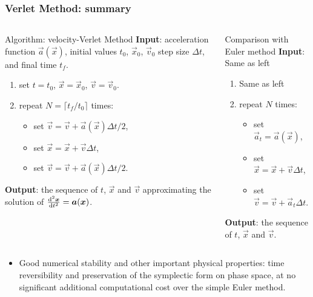 \documentclass[11pt,aspectratio=169,handout]{beamer}
\begin{document}
\begin{frame}
\frametitle{Verlet Method: summary}

\begin{columns}[c]


\begin{block}{Algorithm: velocity-Verlet Method}
	\pause
	\textbf{Input}: acceleration function $\vec{a}(\vec{x})$, initial values $t_0$, $\vec{x}_0$, $\vec{v}_0$ step size $\Delta t$, and final time $t_f$. 
	\pause
	\begin{enumerate}
		\item set $t=t_0$, $\vec{x}=\vec{x}_0$, $\vec{v}=\vec{v}_0$. 
	
		\item repeat $N = \lceil t_f/t_0\rceil$ times:
		\pause
		\begin{itemize}
			\item set $\vec{v} = \vec{v} + \vec{a}(\vec{x})\Delta t / 2$,
			\pause
			\item set $\vec{x} = \vec{x} + \vec{v}\Delta t$,
			\pause
			\item set  $\vec{v} = \vec{v} + \vec{a}(\vec{x})\Delta t / 2$.
		\end{itemize}		
	\end{enumerate}  
	\pause
	\textbf{Output}: the sequence of $t$, $\vec{x}$ and $\vec{v}$ approximating the solution of $\frac{{\rm {d}}^2 \boldsymbol{x}}{{\rm {d}} t^2} = \boldsymbol{a}(\boldsymbol{x})$.
\end{block}
\pause
\begin{alertblock}{Comparison with Euler method}
	\pause
	\textbf{Input}: Same as left
	\pause
	\begin{enumerate}
		\item Same as left
		
		\item repeat $N$ times:
		\pause
		\begin{itemize}
			\item set $\vec{a}_t = \vec{a}(\vec{x})$,
			\pause
			\item set $\vec{x} = \vec{x} + \vec{v}\Delta t$,
			\pause
			\item set  $\vec{v} = \vec{v} + \vec{a}_t\Delta t$.
		\end{itemize}		
	\end{enumerate}  
	\pause
	\textbf{Output}: the sequence of $t$, $\vec{x}$ and $\vec{v}$.
\end{alertblock}

\end{columns}
\vspace{0.4cm}
\begin{itemize}
	\item Good numerical stability and other important physical properties: time reversibility and preservation of the symplectic form on phase space, at no significant additional computational cost over the simple Euler method.
\end{itemize}
\end{frame}
\end{document}
